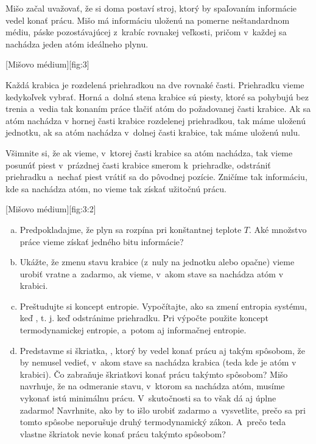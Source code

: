 Mišo začal uvažovať, že si doma postaví stroj, ktorý by spaľovaním informácie vedel konať prácu.
Mišo má informáciu uloženú na pomerne neštandardnom médiu, páske pozostávajúcej z~krabíc rovnakej veľkosti,
pričom v~každej sa nachádza jeden atóm ideálneho plynu.

[Mišovo médium][fig:3]

Každá krabica je rozdelená priehradkou na dve rovnaké časti. Priehradku vieme kedykoľvek vybrať.
Horná a~dolná stena krabice sú piesty, ktoré sa pohybujú bez trenia a~vedia tak konaním práce tlačiť
atóm do požadovanej časti krabice. Ak sa atóm nachádza v hornej časti krabice rozdelenej priehradkou,
tak máme uloženú jednotku, ak sa atóm nachádza v~dolnej časti krabice, tak máme uloženú nulu. 
 
Všimnite si, že ak vieme, v~ktorej časti krabice sa atóm nachádza, tak vieme posunúť piest v~prázdnej
časti krabice smerom k~priehradke, odstrániť priehradku a~nechať piest vrátiť sa do pôvodnej pozície.
Zničíme tak informáciu, kde sa nachádza atóm, no vieme tak získať užitočnú prácu.

[Mišovo médium][fig:3:2]

\begin{enumerate}[(a)]
	\item Predpokladajme, že plyn sa rozpína pri konštantnej teplote $T$.
		Aké množstvo práce vieme získať  jedného bitu informácie?
	\item Ukážte, že zmenu stavu krabice (z~nuly na jednotku alebo opačne) vieme urobiť vratne a~zadarmo,
		ak vieme, v~akom stave sa nachádza atóm v krabici.
	\item Preštudujte si koncept entropie. Vypočítajte, ako sa zmení entropia systému,
		keď , t. j. keď odstránime priehradku. Pri výpočte použite koncept
		termodynamickej entropie, a~potom aj informačnej entropie.
	\item Predstavme si škriatka, , ktorý by vedel konať prácu aj takým spôsobom,
		že by nemusel vedieť, v~akom stave sa nachádza krabica (teda kde je atóm v krabici).
		Čo zabraňuje škriatkovi konať prácu takýmto spôsobom? Mišo navrhuje, že na odmeranie stavu,
		v~ktorom sa nachádza atóm, musíme vykonať istú minimálnu prácu. V~skutočnosti sa to však dá aj úplne zadarmo!
		Navrhnite, ako by to išlo urobiť zadarmo a~vysvetlite, prečo sa pri tomto spôsobe neporušuje druhý
		termodynamický zákon. A~prečo teda vlastne škriatok nevie konať prácu takýmto spôsobom?
\end{enumerate}
